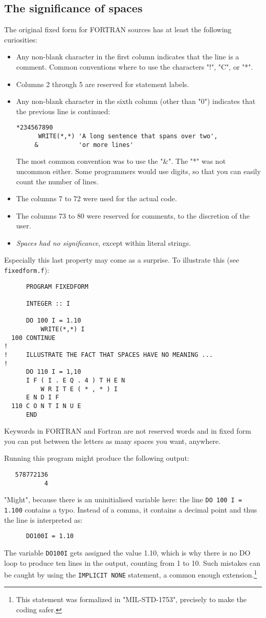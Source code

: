\subsection{The significance of spaces}
The original fixed form for FORTRAN sources has at least the following curiosities:
\begin{itemize}
\item
Any non-blank character in the first column indicates that the line is a comment.
Common conventions where to use the characters "!", "C", or "*".
\item
Columns 2 through 5 are reserved for statement labels.
\item
Any non-blank character in the sixth column (other than "0") indicates that the previous line is continued:
\begin{verbatim}
*234567890
      WRITE(*,*) 'A long sentence that spans over two',
     &           'or more lines'
\end{verbatim}
The most common convention was to use the "\&". The "*" was not uncommon either.
Some programmers would use digits, so that you can easily count the number of lines.
\item
The columns 7 to 72 were used for the actual code.
\item
The columns 73 to 80 were reserved for comments, to the discretion of the user.
\item
\emph{Spaces had no significance}, except within literal strings.
\end{itemize}

Especially this last property may come as a surprise. To illustrate this (see \verb+fixedform.f+):
\begin{verbatim}
      PROGRAM FIXEDFORM

      INTEGER :: I

      DO 100 I = 1.10
          WRITE(*,*) I
  100 CONTINUE
!
!     ILLUSTRATE THE FACT THAT SPACES HAVE NO MEANING ...
!
      DO 110 I = 1,10
      I F ( I . E Q . 4 ) T H E N
          W R I T E ( * , * ) I
      E N D I F
  110 C O N T I N U E
      END
\end{verbatim}
Keywords in FORTRAN and Fortran are not reserved words and in fixed form you can
put between the letters as many spaces you want, anywhere.

Running this program might produce the following output:
\begin{verbatim}
   578772136
           4
\end{verbatim}
"Might", because there is an uninitialised variable here: the line \verb+DO 100 I = 1.100+
contains a typo. Instead of a comma, it contains a decimal point and thus the line is
interpreted as:
\begin{verbatim}
      DO100I = 1.10
\end{verbatim}
The variable \verb+DO100I+ gets assigned the value 1.10, which is why there is no DO loop
to produce ten lines in the output, counting from 1 to 10. Such mistakes can be caught
by using the \verb+IMPLICIT NONE+ statement, a common enough extension.\cite{drFortranImplicit}\footnote{This statement
was formalized in "MIL-STD-1753", precisely to make the coding safer.}


